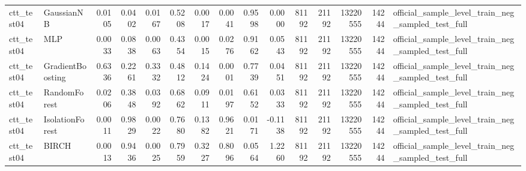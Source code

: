 \begin{tabular}{llrrrrrrrrrrrrl}
ctt\_test04 & GaussianNB & 0.0105 & 0.0402 & 0.0167 & 0.5208 & 0.0017 & 0.0041 & 0.9598 & 0.0000 & 81192 & 21192 & 13220555 & 14244 & official\_sample\_level\_train\_neg\_sampled\_test\_full \\
ctt\_test04 & MLP & 0.0033 & 0.0838 & 0.0063 & 0.4354 & 0.0015 & 0.0276 & 0.9162 & 0.0543 & 81192 & 21192 & 13220555 & 14244 & official\_sample\_level\_train\_neg\_sampled\_test\_full \\
ctt\_test04 & GradientBoosting & 0.6336 & 0.2261 & 0.3332 & 0.4812 & 0.1424 & 0.0001 & 0.7739 & 0.0451 & 81192 & 21192 & 13220555 & 14244 & official\_sample\_level\_train\_neg\_sampled\_test\_full \\
ctt\_test04 & RandomForest & 0.0206 & 0.3848 & 0.0392 & 0.6862 & 0.0911 & 0.0197 & 0.6152 & 0.0333 & 81192 & 21192 & 13220555 & 14244 & official\_sample\_level\_train\_neg\_sampled\_test\_full \\
ctt\_test04 & IsolationForest & 0.0011 & 0.9829 & 0.0022 & 0.7680 & 0.1382 & 0.9621 & 0.0171 & -0.1138 & 81192 & 21192 & 13220555 & 14244 & official\_sample\_level\_train\_neg\_sampled\_test\_full \\
ctt\_test04 & BIRCH & 0.0013 & 0.9436 & 0.0025 & 0.7959 & 0.3227 & 0.8096 & 0.0564 & 1.2260 & 81192 & 21192 & 13220555 & 14244 & official\_sample\_level\_train\_neg\_sampled\_test\_full \\
\bottomrule
\end{tabular}
